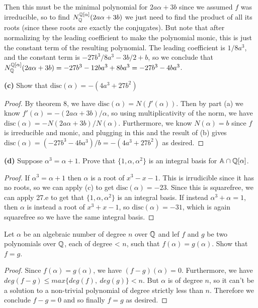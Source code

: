 \documentclass[11pt]{article}
\newcommand{\disc}{\text{disc}}
\begin{document}
  Then this must be the minimal polynomial for $2a\alpha+3b$ since we assumed $f$ was irreducible, so to find $N_{\mathbb{Q}}^{\mathbb{Q}[\alpha]}(2a\alpha+3b)$ we just need to find the product of all its roots (since these roots are exactly the conjugates).
  But note that after normalizing by the leading coefficient to make the polynomial monic, this is just the constant term of the resulting polynomial.
  The leading coefficient is $1/8a^3$, and the constant term is $-27b^3/8a^3-3b/2+b$, so we conclude that $N_{\mathbb{Q}}^{\mathbb{Q}[\alpha]}(2a\alpha+3b) = -27b^3-12ba^3 + 8ba^3 = -27b^3-4ba^3$.

\textbf{(c)} Show that $\disc(\alpha) = -(4a^3+27b^2)$

\begin{proof}
  By theorem 8, we have $\disc(\alpha) = N(f'(\alpha))$.
  Then by part (a) we know $f'(\alpha) = -(2a\alpha + 3b)/\alpha$, so using multiplicativity of the norm, we have $\disc(\alpha) = -N(2a\alpha + 3b)/N(\alpha)$.
  Furthermore, we know $N(\alpha) = b$ since $f$ is irreducible and monic, and plugging in this and the result of (b) gives $\disc(\alpha) = (-27b^3-4ba^3)/b = -(4a^3 + 27b^2)$ as desired.
\end{proof}

\textbf{(d)} Suppose $\alpha^3 = \alpha + 1$. Prove that $\{1,\alpha,\alpha^2\}$ is an integral basis for $\mathbb{A} \cap \mathbb{Q}[\alpha]$.

\begin{proof}
  If $\alpha^3 = \alpha + 1$ then $\alpha$ is a root of $x^3 - x - 1$. This is irrudicible since it has no roots, so we can apply (c) to get $\disc(\alpha) = -23$.
  Since this is squarefree, we can apply 27.e to get that $\{1,\alpha,\alpha^2\}$ is an integral basis.
  If instead $\alpha^3 + \alpha = 1$, then $\alpha$ is instead a root of $x^3 + x - 1$, so $\disc(\alpha) = -31$, which is again squarefree so we have the same integral basis.
\end{proof}


Let $\alpha$ be an algebraic number of degree $n$ over $\mathbb{Q}$ and lef $f$ and $g$ be two polynomials over $\mathbb{Q}$, each of degree < $n$, such that $f(\alpha) = g(\alpha)$. Show that $f = g$.

\begin{proof}
  Since $f(\alpha) = g(\alpha)$, we have $(f - g)(\alpha) = 0$.
  Furthermore, we have $deg(f-g) \le max\{deg(f),\ deg(g)\} < n$.
  But $\alpha$ is of degree $n$, so it can't be a solution to a non-trivial polynomial of degree strictly less than $n$.
  Therefore we conclude $f - g = 0$ and so finally $f = g$ as desired.
\end{proof}
\end{document}

